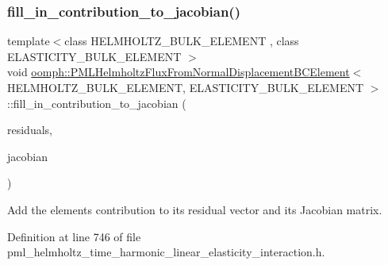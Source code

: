 \subsubsection{\texorpdfstring{fill\+\_\+in\+\_\+contribution\+\_\+to\+\_\+jacobian()}{fill\_in\_contribution\_to\_jacobian()}}
{\footnotesize\ttfamily template$<$class H\+E\+L\+M\+H\+O\+L\+T\+Z\+\_\+\+B\+U\+L\+K\+\_\+\+E\+L\+E\+M\+E\+NT , class E\+L\+A\+S\+T\+I\+C\+I\+T\+Y\+\_\+\+B\+U\+L\+K\+\_\+\+E\+L\+E\+M\+E\+NT $>$ \\
void \hyperlink{classoomph_1_1PMLHelmholtzFluxFromNormalDisplacementBCElement}{oomph\+::\+P\+M\+L\+Helmholtz\+Flux\+From\+Normal\+Displacement\+B\+C\+Element}$<$ H\+E\+L\+M\+H\+O\+L\+T\+Z\+\_\+\+B\+U\+L\+K\+\_\+\+E\+L\+E\+M\+E\+NT, E\+L\+A\+S\+T\+I\+C\+I\+T\+Y\+\_\+\+B\+U\+L\+K\+\_\+\+E\+L\+E\+M\+E\+NT $>$\+::fill\+\_\+in\+\_\+contribution\+\_\+to\+\_\+jacobian (\begin{DoxyParamCaption}\item[{Vector$<$ double $>$ \&}]{residuals,  }\item[{Dense\+Matrix$<$ double $>$ \&}]{jacobian }\end{DoxyParamCaption})\hspace{0.3cm}{\ttfamily [inline]}}



Add the element\textquotesingle{}s contribution to its residual vector and its Jacobian matrix. 



Definition at line 746 of file pml\+\_\+helmholtz\+\_\+time\+\_\+harmonic\+\_\+linear\+\_\+elasticity\+\_\+interaction.\+h.

\mbox{\label{classoomph_1_1PMLHelmholtzFluxFromNormalDisplacementBCElement_ab43c2c8e318060cf808329b1c147a333}} 
